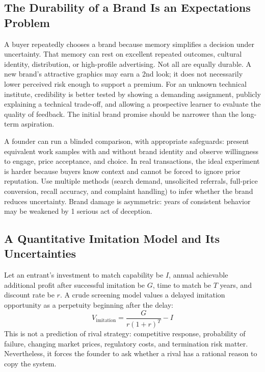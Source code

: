 \subsection{The Durability of a Brand Is an Expectations Problem}
\label{sec:durability_of_brand_expectations}

A buyer repeatedly chooses a brand because memory simplifies a decision under uncertainty. That memory can rest on excellent repeated outcomes, cultural identity, distribution, or high-profile advertising. Not all are equally durable. A new brand's attractive graphics may earn a 2nd look; it does not necessarily lower perceived risk enough to support a premium. For an unknown technical institute, credibility is better tested by showing a demanding assignment, publicly explaining a technical trade-off, and allowing a prospective learner to evaluate the quality of feedback. The initial brand promise should be narrower than the long-term aspiration.

A founder can run a blinded comparison, with appropriate safeguards: present equivalent work samples with and without brand identity and observe willingness to engage, price acceptance, and choice. In real transactions, the ideal experiment is harder because buyers know context and cannot be forced to ignore prior reputation. Use multiple methods (search demand, unsolicited referrals, full-price conversion, recall accuracy, and complaint handling) to infer whether the brand reduces uncertainty. Brand damage is asymmetric: years of consistent behavior may be weakened by 1 serious act of deception.

\subsection{A Quantitative Imitation Model and Its Uncertainties}
\label{sec:quantitative_imitation_model}

Let an entrant's investment to match capability be $I$, annual achievable additional profit after successful imitation be $G$, time to match be $T$ years, and discount rate be $r$. A crude screening model values a delayed imitation opportunity as a perpetuity beginning after the delay:
\begin{equation}
\label{eq:imitation_value}
V_{\text{imitation}} = \frac{G}{r(1+r)^T} - I
\end{equation}
This is not a prediction of rival strategy: competitive response, probability of failure, changing market prices, regulatory costs, and termination risk matter. Nevertheless, it forces the founder to ask whether a rival has a rational reason to copy the system.

